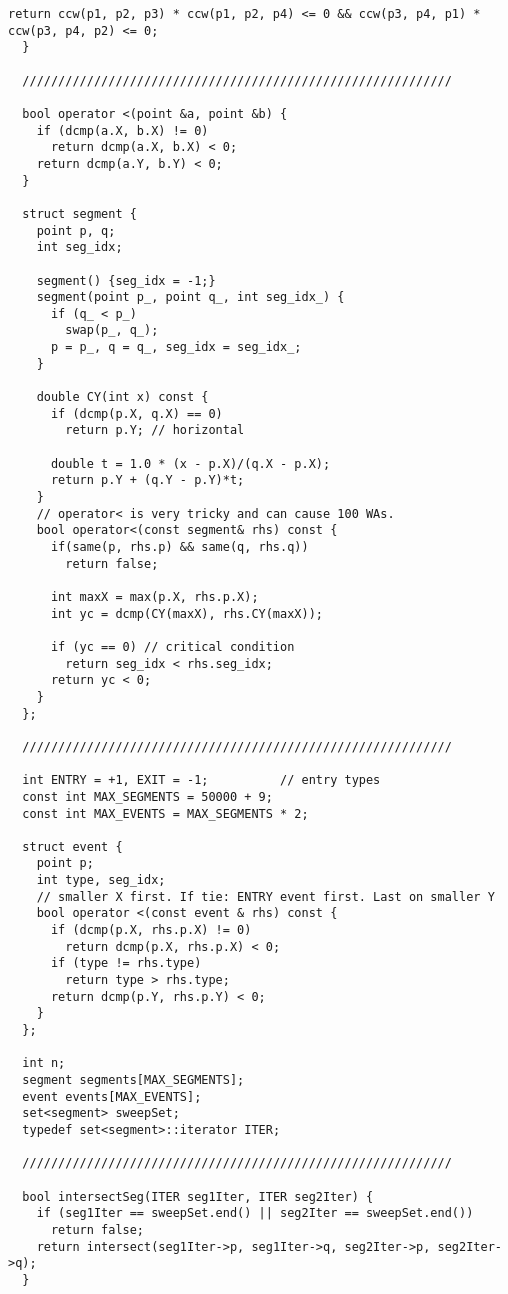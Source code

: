 \begin{lstlisting}[style=cpp]
    return ccw(p1, p2, p3) * ccw(p1, p2, p4) <= 0 && ccw(p3, p4, p1) * ccw(p3, p4, p2) <= 0;
  }

  ////////////////////////////////////////////////////////////

  bool operator <(point &a, point &b) {
    if (dcmp(a.X, b.X) != 0)
      return dcmp(a.X, b.X) < 0;
    return dcmp(a.Y, b.Y) < 0;
  }

  struct segment {
    point p, q;
    int seg_idx;

    segment() {seg_idx = -1;}
    segment(point p_, point q_, int seg_idx_) {
      if (q_ < p_)
        swap(p_, q_);
      p = p_, q = q_, seg_idx = seg_idx_;
    }

    double CY(int x) const {
      if (dcmp(p.X, q.X) == 0)
        return p.Y; // horizontal

      double t = 1.0 * (x - p.X)/(q.X - p.X);
      return p.Y + (q.Y - p.Y)*t;
    }
    // operator< is very tricky and can cause 100 WAs.
    bool operator<(const segment& rhs) const {
      if(same(p, rhs.p) && same(q, rhs.q))
        return false;

      int maxX = max(p.X, rhs.p.X);
      int yc = dcmp(CY(maxX), rhs.CY(maxX));

      if (yc == 0) // critical condition
        return seg_idx < rhs.seg_idx;
      return yc < 0;
    }
  };

  ////////////////////////////////////////////////////////////

  int ENTRY = +1, EXIT = -1;          // entry types
  const int MAX_SEGMENTS = 50000 + 9;
  const int MAX_EVENTS = MAX_SEGMENTS * 2;

  struct event {
    point p;
    int type, seg_idx;
    // smaller X first. If tie: ENTRY event first. Last on smaller Y
    bool operator <(const event & rhs) const {
      if (dcmp(p.X, rhs.p.X) != 0)
        return dcmp(p.X, rhs.p.X) < 0;
      if (type != rhs.type)
        return type > rhs.type;
      return dcmp(p.Y, rhs.p.Y) < 0;
    }
  };

  int n;
  segment segments[MAX_SEGMENTS];
  event events[MAX_EVENTS];
  set<segment> sweepSet;
  typedef set<segment>::iterator ITER;

  ////////////////////////////////////////////////////////////

  bool intersectSeg(ITER seg1Iter, ITER seg2Iter) {
    if (seg1Iter == sweepSet.end() || seg2Iter == sweepSet.end())
      return false;
    return intersect(seg1Iter->p, seg1Iter->q, seg2Iter->p, seg2Iter->q);
  }


\end{lstlisting}
